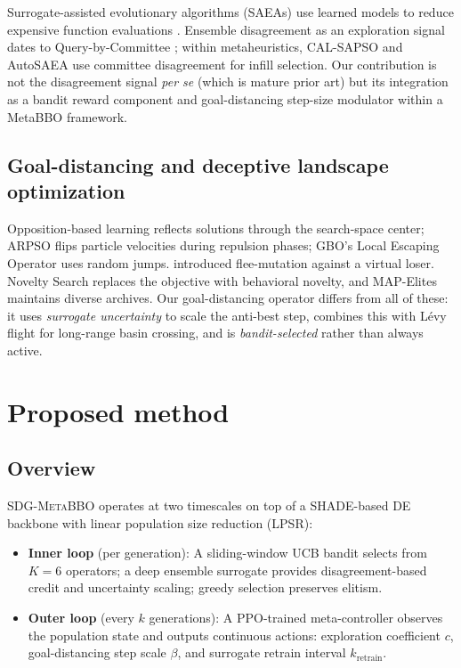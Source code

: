 \documentclass[preprint,12pt,authoryear]{elsarticle}
\newcommand{\sdg}{\textsc{SDG-MetaBBO}}
\begin{document}
Surrogate-assisted evolutionary algorithms (SAEAs) use learned models to reduce expensive function evaluations \citep{He2023review}. Ensemble disagreement as an exploration signal dates to Query-by-Committee \citep{Seung1992}; within metaheuristics, CAL-SAPSO \citep{Wang2017} and AutoSAEA \citep{Xie2023} use committee disagreement for infill selection. Our contribution is not the disagreement signal \emph{per se} (which is mature prior art) but its integration as a bandit reward component and goal-distancing step-size modulator within a MetaBBO framework.

\subsection{Goal-distancing and deceptive landscape optimization}

Opposition-based learning \citep{Tizhoosh2005} reflects solutions through the search-space center; ARPSO \citep{Riget2002} flips particle velocities during repulsion phases; GBO's Local Escaping Operator \citep{Ahmadianfar2020} uses random jumps. \citet{Sebag2006} introduced flee-mutation against a virtual loser. Novelty Search \citep{Lehman2011} replaces the objective with behavioral novelty, and MAP-Elites \citep{Mouret2015} maintains diverse archives. Our goal-distancing operator differs from all of these: it uses \emph{surrogate uncertainty} to scale the anti-best step, combines this with L\'evy flight for long-range basin crossing, and is \emph{bandit-selected} rather than always active.

\section{Proposed method}
\label{sec:method}

\subsection{Overview}

\sdg{} operates at two timescales on top of a SHADE-based DE backbone \citep{Tanabe2014} with linear population size reduction (LPSR):

\begin{itemize}
\item \textbf{Inner loop} (per generation): A sliding-window UCB bandit selects from $K = 6$ operators; a deep ensemble surrogate provides disagreement-based credit and uncertainty scaling; greedy selection preserves elitism.
\item \textbf{Outer loop} (every $k$ generations): A PPO-trained meta-controller observes the population state and outputs continuous actions: exploration coefficient $c$, goal-distancing step scale $\beta$, and surrogate retrain interval $k_{\text{retrain}}$.
\end{itemize}
\end{document}
